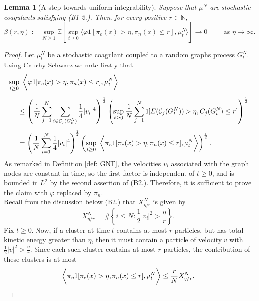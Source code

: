 \documentclass[11pt, notitlepage]{article}
\newcommand{\NN}{\ensuremath{\mathbb{N}}}
\newtheorem{lem}[thm]{Lemma}
\begin{document}
\fi
\begin{lem}[A step towards uniform integrability]\label{lemma: STUI}
Suppose that $\mu^N$ are stochastic coagulants satisfying (B1-2.). Then, for every positive $r \in \NN$,
\begin{equation}
    \beta(r,\eta):= \sup_{N\geq 1}
      \mathbb{E}\left[\sup_{t\geq 0}\bigg\langle \varphi 1[\pi_e(x)>\eta, \pi_n(x)\leq r], \mu^N_t\bigg\rangle \right]
    \rightarrow 0\hspace{1cm} \text{as }\eta\rightarrow \infty.
\end{equation}
\end{lem}
\begin{proof}
Let $\mu^N_t$ be a stochastic coagulant coupled to a random graphs process $G^N_t$. Using Cauchy-Schwarz we note firstly that
\begin{equation} \begin{split}
 &\sup_{t\geq 0}\hspace{0.1cm}\bigg\langle \varphi 1[\pi_e(x)>\eta, \pi_n(x)\leq r], \mu^N_t\bigg\rangle
  \\[1ex] & \hspace{0.5cm}
\leq
  \left(\frac1N\sum_{j=1}^N \sum_{i \in \mathcal{C}_j(G_t^N)}\frac14 |v_i|^4 \right)^{\frac12}
  \left(\sup_{t\geq 0}\frac1N \sum_{j=1}^N    1[E(\mathcal{C}_j(G_t^N)) > \eta, C_j(G_t^N)\leq r]\right)^{\frac12} \\[1ex] & \hspace{0.5cm}
=
  \left(\frac1N\sum_{i=1}^N \frac14 |v_i|^4 \right)^{\frac12}
  \left(\sup_{t\geq 0}\hspace{0.1cm}\bigg\langle \pi_n 1[\pi_e(x)>\eta, \pi_n(x)\leq r], \mu^N_t\bigg\rangle\right)^{\frac12}.
\end{split}\end{equation}
As remarked in Definition \ref{def: GNT}, the velocities $v_i$ associated with the graph nodes are constant in time, so the first factor is independent of $t\ge 0$, and is bounded in $L^2$ by the second assertion of (B2.).
Therefore, it is sufficient to prove the claim with $\varphi$ replaced by $\pi_n$.
\bigskip \\  Recall from the discussion below (B2.) that $X^N_{\eta/r}$ is given by \begin{equation} X^N_{\eta/r}=\#\left\{i\le N: \frac{1}{2}|v_i|^2>\frac{\eta}{r}\right\}.\end{equation} Fix $t\ge 0$. Now, if a cluster at time $t$ contains at most $r$ particles, but has total kinetic energy greater than $\eta$, then it must contain a particle of velocity $v$ with $\frac{1}{2}|v|^2>\frac{\eta}{r}$. Since each such cluster contains at most $r$ particles, the contribution of these clusters is at most \begin{equation}\bigg \langle \pi_n 1[\pi_e(x)>\eta, \pi_n(x)\le r], \hspace{0.005cm}\mu^N_t\bigg \rangle \le \frac{r}{N} \hspace{0.005cm}X^N_{\eta/r}.   \end{equation}  

\end{proof}
\end{document}
